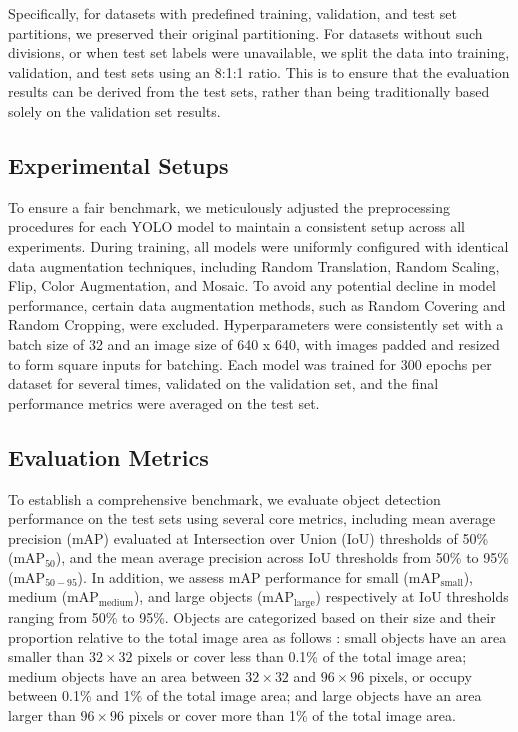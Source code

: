 \documentclass[runningheads]{llncs}
\begin{document}
Specifically, for datasets with predefined training, validation, and test set partitions, we preserved their original partitioning. For datasets without such divisions, or when test set labels were unavailable, we split the data into training, validation, and test sets using an 8:1:1 ratio. This is to ensure that the evaluation results can be derived from the test sets, rather than being traditionally based solely on the validation set results.


\subsection{Experimental Setups}
To ensure a fair benchmark, we meticulously adjusted the preprocessing procedures for each YOLO model to maintain a consistent setup across all experiments. During training, all models were uniformly configured with identical data augmentation techniques, including Random Translation, Random Scaling, Flip, Color Augmentation, and Mosaic. To avoid any potential decline in model performance, certain data augmentation methods, such as Random Covering and Random Cropping, were excluded.
Hyperparameters were consistently set with a batch size of 32 and an image size of 640 x 640, with images padded and resized to form square inputs for batching. Each model was trained for 300 epochs per dataset for several times, validated on the validation set, and the final performance metrics were averaged on the test set.



\subsection{Evaluation Metrics}
To establish a comprehensive benchmark, we evaluate object detection performance on the test sets using several core metrics, including mean average precision (mAP) evaluated at Intersection over Union (IoU) thresholds of 50\% (mAP$_{50}$), and the mean average precision across IoU thresholds from 50\% to 95\% (mAP$_{50-95}$). In addition, we assess mAP performance for small (mAP$_{\text{small}}$), medium (mAP$_{\text{medium}}$), and large objects (mAP$_{\text{large}}$) respectively at IoU thresholds ranging from 50\% to 95\%. Objects are categorized based on their size and their proportion relative to the total image area as follows \cite{Lin2014}: small objects have an area smaller than $32\times32$ pixels or cover less than 0.1\% of the total image area; medium objects have an area between $32\times32$ and $96\times96$ pixels, or occupy between 0.1\% and 1\% of the total image area; and large objects have an area larger than $96\times96$ pixels or cover more than 1\% of the total image area.
\end{document}
